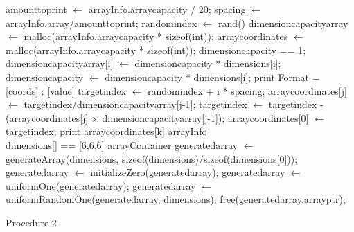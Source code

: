 \documentclass[10pt,twocolumn]{witseiepaper}
\begin{document}
\begin{appendix}
\begin{algorithm}[htbp]
	\begin{algorithmic}
		\State amount\textunderscore to\textunderscore print $\leftarrow$ arrayInfo.array\textunderscore capacity / 20;
		\State spacing $\leftarrow$ arrayInfo.array/amount\textunderscore to\textunderscore print;
		\State random\textunderscore index $\leftarrow$ rand() %
		\State dimension\textunderscore capacity\textunderscore array $\leftarrow$ malloc(arrayInfo.array\textunderscore capacity * sizeof(int));
		\State array\textunderscore coordinates $\leftarrow$ malloc(arrayInfo.array\textunderscore capacity * sizeof(int));
		\State dimension\textunderscore capacity == 1;
		\State dimension\textunderscore capacity\textunderscore array[i] $\leftarrow$ dimension\textunderscore capacity *  dimensions[i];
		\State dimension\textunderscore capacity $\leftarrow$ dimension\textunderscore capacity * dimensions[i];
		\EndFor
		\EndFunction
		\State print Format = [coords] : [value]
		\State target\textunderscore index $\leftarrow$ random\textunderscore index + i * spacing;
		\State array\textunderscore coordinates[j] $\leftarrow$ target\textunderscore index/dimension\textunderscore capacity\textunderscore array[j-1];
		\State target\textunderscore index $\leftarrow$ target\textunderscore index - (array\textunderscore coordinates[j] $\times$ \textunderscore dimension\textunderscore capacity\textunderscore array[j-1]);
		\EndIf
		\State array\textunderscore coordinates[0] $\leftarrow$ target\textunderscore index;
		\EndFor
		\State print array\textunderscore coordinates[k]
		\EndFor
		\EndFor
		\State \Return arrayInfo 
		\EndFunction \\
		
		\State dimensions[] == [6,6,6]
		\State arrayContainer generated\textunderscore array $\leftarrow$ generateArray(dimensions, sizeof(dimensions)/sizeof(dimensions[0]));
		\State generated\textunderscore array $\leftarrow$ initializeZero(generated\textunderscore array);
		\State generated\textunderscore array $\leftarrow$ uniformOne(generated\textunderscore array);
		\State generated\textunderscore array $\leftarrow$ uniformRandomOne(generated\textunderscore array, dimensions);
		\State free(generated\textunderscore array.array\textunderscore ptr);
		\EndFunction
		
		
		\caption{Procedure 2}
		\label{alg:1}
	\end{algorithmic}
\end{algorithm}

\end{appendix}
\end{document}
